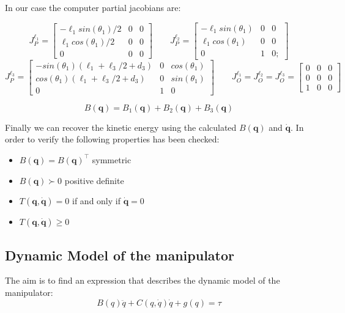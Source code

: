 \documentclass[a4paper,12pt]{article}
\renewcommand*{\l}{\ell}
\newcommand*{\q}{\bm{q}}
\newcommand*{\dotq}{\dot{\q}}
\begin{document}
\noindent In our case the computer partial jacobians are:

\[
    J^{\l_1}_{P} = \begin{bmatrix}
        -\l_1sin(\theta_1)/2 & 0 & 0 \\
 \l_1cos(\theta_1)/2 &0 &0 \\
               0 &0 &0
    \end{bmatrix}
    \qquad
    J^{\l_2}_{P} = \begin{bmatrix}
        - \l_1sin(\theta_1) &0 &0\\
\l_1cos(\theta_1) & 0 &0\\
                            0& 1& 0;
    \end{bmatrix}
\]
\[
    J^{\l_3}_{P} = \begin{bmatrix}
        -sin(\theta_1)(\l_1 + \l_3/2 + d_3) &0 & cos(\theta_1)\\
 cos(\theta_1)(\l_1 + \l_3/2 + d_3) &0 &sin(\theta_1)\\
                          0 &1 &      0
    \end{bmatrix}
    \qquad
    J^{\l_1}_{O} = J^{\l_2}_{O} = J^{\l_3}_{O} =\begin{bmatrix}
        0 &0 &0\\ 0& 0 &0\\ 1& 0& 0
    \end{bmatrix}
\]

\[
  B(\textbf{q}) = B_1(\textbf{q}) + B_2(\textbf{q}) +B_3(\textbf{q}) 
\]

\noindent Finally we can recover the kinetic energy using the calculated $B(\textbf{q})$ and $ \dot{\textbf{q}}$. In order to verify the following properties has been checked: 
\bigskip
\begin{itemize}
    \item $B(\q) = B(\q)^\top$ symmetric
    \item $B(\q) \succ 0$ positive definite
    \item $T(\q, \dotq) = 0$ if and only if $ \dotq = 0$
    \item $T(\q, \dotq) \geq 0$
\end{itemize}

\subsection{Dynamic Model of the manipulator}
The aim is to find an expression that describes the dynamic model of the manipulator:
\[
    B(q)\ddot{q} + C(q, \dot{q})\dot{q} + g(q) = \tau
\]
\end{document}
